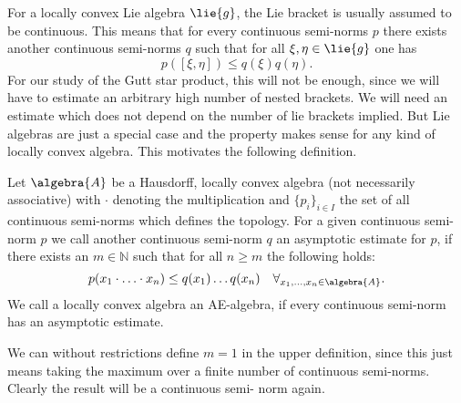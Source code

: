 For a locally convex Lie algebra $\lie{g}$, the Lie bracket is usually 
assumed to be continuous. This means that for every continuous 
semi-norms $p$ there exists another continuous semi-norms $q$ such that 
for all $\xi, \eta \in \lie{g}$ one has
\begin{equation*}
	p([\xi, \eta])
	\leq
	q(\xi) q(\eta).
\end{equation*}
For our study of the Gutt star product, this will not be enough, since 
we will have to estimate an arbitrary high number of nested brackets. We 
will need an estimate which does not depend on the number of lie 
brackets implied. But Lie algebras are just a special case and the 
property makes sense for any kind of locally convex algebra. This 
motivates the following definition.
\begin{definition}
	\label{def:AE}
	Let $\algebra{A}$ be a Hausdorff, locally convex algebra (not 
	necessarily 	associative) with $\cdot$ denoting the multiplication 
	and 	$\{p_i\}_{i\in I}$ the set of all continuous semi-norms which 
	defines the topology. For a given continuous semi-norm $p$ we call 
	another continuous semi-norm $q$ an asymptotic estimate for $p$, if 
	there exists an $m \in \mathbb{N}$ such that for all $n \geq m$ the 
	following holds:
	\begin{equation}
		\label{Intro:AE}
		p(x_1 \cdot \ldots \cdot x_n)
		\leq
		q(x_1) \ldots q(x_n)
		\quad
		\forall_{x_1, \ldots, x_n \in \algebra{A}}.
	\end{equation}
	We call a locally convex algebra an AE-algebra, if every continuous 
	semi-norm has an asymptotic estimate.
\end{definition}
\begin{remark}
	We can without restrictions define $m = 1$ in the upper definition, 
	since this just means taking the maximum over a finite number of 
	continuous semi-norms. Clearly the result will be a continuous semi-
	norm again.
\end{remark}
